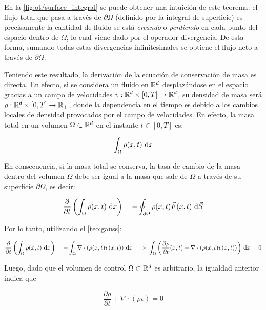 En la \autoref{fig:ot/surface_integral} se puede obtener una intuición de este teorema: el flujo total que pasa a través de $\partial\Omega$ (definido por la integral de superficie) es precisamente la cantidad de fluido se está \textit{creando} o \textit{perdiendo} en cada punto del espacio dentro de $\Omega$, lo cual viene dado por el operador divergencia. De esta forma, sumando todas estas divergencias infinitesimales se obtiene el flujo neto a través de $\partial\Omega$. 


Teniendo este resultado, la derivación de la ecuación de conservación de masa es directa. En efecto, si se considera un fluido en $\mathbb{R}^d$ desplazándose en el espacio gracias a un campo de velocidades $v:\mathbb{R}^d\times[0,T]\to\mathbb{R}^d$, su densidad de masa será $\rho:\mathbb{R}^d\times[0,T]\to\mathbb{R}_+$, donde la dependencia en el tiempo es debido a los cambios locales de densidad provocados por el campo de velocidades. En efecto, la masa total en un volumen $\Omega\subset\mathbb{R}^d$ en el instante $t\in[0,T]$ es:

\begin{equation*}
	\int_\Omega \rho(x,t) \,\operatorname{d}\! x
\end{equation*}

En consecuencia, si la masa total se conserva, la tasa de cambio de la masa dentro del volumen $\Omega$ debe ser igual a la masa que sale de $\Omega$ a través de su superficie $\partial\Omega$, es decir:

\begin{equation*}
	\frac{\partial}{\partial t}\left(\int_\Omega \rho(x,t) \,\operatorname{d}\! x\right)
	= - \oint_{\partial\Omega} \rho(x,t)\vec{F}(x,t) \,\operatorname{d}\! \vec{S}
\end{equation*}

Por lo tanto, utilizando el \autoref{teo:gauss}:

\begin{equation*}
	\frac{\partial}{\partial t}\left(\int_\Omega \rho(x,t) \,\operatorname{d}\! x\right)
	= - \int_\Omega \nabla\cdot\left(\rho(x,t)v(x,t)\right) \,\operatorname{d}\! x
	\implies
	\int_\Omega \left(\frac{\partial\rho}{\partial t}(x,t) + \nabla\cdot(\rho(x,t) v(x,t))\right) \,\operatorname{d}\! x = 0
\end{equation*}

Luego, dado que el volumen de control $\Omega\subset\mathbb{R}^d$ es arbitrario, la igualdad anterior indica que

\begin{equation}
	\label{eq:transport_eq}
	\frac{\partial\rho}{\partial t} + \nabla\cdot(\rho v) = 0
\end{equation}

